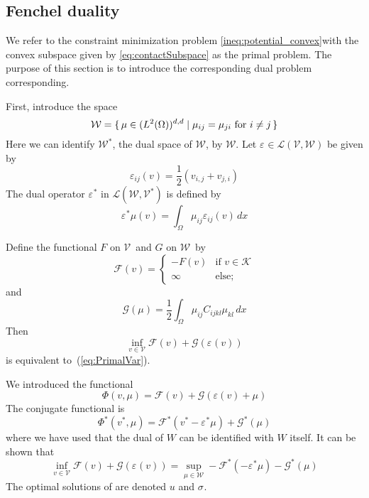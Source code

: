 \documentclass[12pt,a4paper]{article}
\numberwithin{equation}{section}
\numberwithin{table}{section}
\numberwithin{figure}{section}
\newcommand{\W}{\ensuremath{\mathcal{W}}}
\newcommand{\half}{\ensuremath{\frac{1}{2}}}
\newcommand{\V}{\ensuremath{\mathcal{V}}}
\newcommand{\K}{\ensuremath{\mathcal{K}}}
\renewcommand{\L}{{\mathcal L}}
\newcommand{\F}{\ensuremath{{\mathcal F}}}
\newcommand{\G}{\ensuremath{{\mathcal G}}}
\newcommand{\intO}{\int_\Omega\!\!}
\renewcommand{\epsilon}{\varepsilon}
\newcommand{\strain}[1][]{\ensuremath{\epsilon_{#1}}}
\newcommand{\epsij}{\strain[ij]}
\newcommand{\stress}[1][]{\ensuremath{\sigma_{#1}}}
\providecommand{\dualp}[2]{\langle #1, #2 \rangle}
\newcommand{\infvinV}{\ensuremath{\inf_{v\in \V}}}
\newcommand{\dx}{{\,dx}}
\begin{document}
\subsection{Fenchel duality}

We refer to the constraint minimization problem \eqref{ineq:potential_convex}with the convex subspace given by \eqref{eq:contactSubspace} as the primal problem. The purpose of this section is to introduce the corresponding dual problem corresponding.

First, introduce the space
\begin{equation}
  \W = \set{\mu \in (L^2(\Omega))^{d,d} | \mu_{ij} = \mu_{ji}
    \text{ for } i\ne j } 
\end{equation}
Here we can identify $\W^*$, the dual space of $\W$, by $\W$.  Let $\strain \in \L(\V,\W)$
be given by
\begin{equation}
  \epsij(v) = \half (v_{i,j} + v_{j,i})
\end{equation}
The dual operator
$\strain^*$ in $\L(\W,\V^*)$ is defined by
\begin{equation}
  \strain^* \mu(v) = \intO \mu_{ij} \epsij(v) \dx
\end{equation}

Define the functional $F$ on \V\ and $G$ on \W\ by
\begin{equation}
  \F(v) =
  \begin{cases}
    -F(v) & \text{if } v \in \K \\
    \infty & \text{else;}
  \end{cases}
\end{equation}
and
\begin{equation}
  \G(\mu) = \half \intO \mu_{ij} C_{ijkl} \mu_{kl} \dx
\end{equation}
Then
\begin{equation}
  \label{ineq:primalFenchel}
  \infvinV \F(v) + \G(\strain(v))
\end{equation}
is equivalent to~(\ref{eq:PrimalVar}).

We introduced the functional
\begin{equation}
\varPhi(v,\mu) = \F(v) + \G(\epsilon(v) + \mu)
\end{equation}
The conjugate functional is
\begin{equation}
  \varPhi^*(v^*, \mu) = \F^*(v^* - \strain^* \mu) + \G^*(\mu)
\end{equation}
where we have used that the dual of $W$ can be identified with $W$ itself. It can be shown that
\begin{equation}
	\label{eq:infsup}
  \inf_{v\in \V} \F(v) + \G(\strain(v))
  = \sup_{\mu\in \W} -\F^*(-\strain^* \mu) - \G^*(\mu)
\end{equation}
The optimal solutions of are denoted $u$ and $ \stress$.
\end{document}
